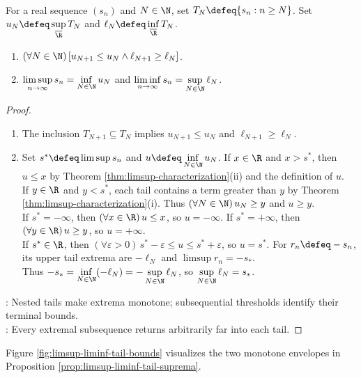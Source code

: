 \begin{proposition} \label{prop:limsup-liminf-tail-suprema} \\
For a real sequence $(s_n)$ and $N\in\N$, set $T_N\defeq\{s_n:n\geq N\}$. Set $u_N\defeq\sup\limits_{\overline{\R}}T_N$ and $\ell_N\defeq\inf\limits_{\overline{\R}}T_N$.
\begin{enumerate}[label=(\roman*)]
\setlength{\itemsep}{0pt}
\item $(\forall N\in\N)\,[u_{N+1}\leq u_N\land\ell_{N+1}\geq\ell_N]$.
\item $\limsup\limits_{n\to\infty}s_n=\inf\limits_{N\in\N}u_N$ and $\liminf\limits_{n\to\infty}s_n=\sup\limits_{N\in\N}\ell_N$.
\end{enumerate}
\begin{proof}
\begin{enumerate}[label=(\roman*)]
\setlength{\itemsep}{0pt}
\item The inclusion $T_{N+1}\subseteq T_N$ implies $u_{N+1}\leq u_N$ and $\ell_{N+1}\geq\ell_N$.
\item Set $s^*\defeq\limsup s_n$ and $u\defeq\inf\limits_{N\in\N}u_N$. If $x\in\R$ and $x>s^*$, then $u\leq x$ by Theorem \ref{thm:limsup-characterization}(ii) and the definition of $u$.\\
If $y\in\R$ and $y<s^*$, each tail contains a term greater than $y$ by Theorem \ref{thm:limsup-characterization}(i). Thus $(\forall N\in\N)\,u_N\geq y$ and $u\geq y$.\\
If $s^*=-\infty$, then $(\forall x\in\R)\,u\leq x$, so $u=-\infty$. If $s^*=+\infty$, then $(\forall y\in\R)\,u\geq y$, so $u=+\infty$.\\
If $s^*\in\R$, then $(\forall\varepsilon>0)\,s^*-\varepsilon\leq u\leq s^*+\varepsilon$, so $u=s^*$. For $r_n\defeq-s_n$, its upper tail extrema are $-\ell_N$ and $\limsup r_n=-s_*$.\\
Thus $-s_*=\inf\limits_{N\in\N}(-\ell_N)=-\sup\limits_{N\in\N}\ell_N$, so $\sup\limits_{N\in\N}\ell_N=s_*$.
\end{enumerate}
: Nested tails make extrema monotone; subsequential thresholds identify their terminal bounds.\\
: Every extremal subsequence returns arbitrarily far into each tail.
\end{proof}
\end{proposition}

\begin{illustrationfigure}[H]
  \centering
  
  \caption{The upper tail extrema $u_N$ decrease to $s^*=\limsup s_n$, while the lower extrema $\ell_N$ increase to $s_*=\liminf s_n$.}
  \label{fig:limsup-liminf-tail-bounds}
\end{illustrationfigure}
Figure \ref{fig:limsup-liminf-tail-bounds} visualizes the two monotone envelopes in Proposition \ref{prop:limsup-liminf-tail-suprema}.

